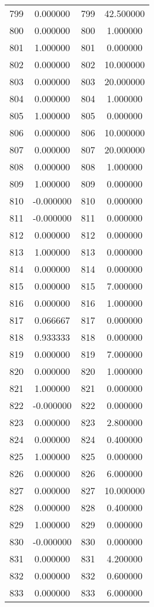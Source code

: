\documentclass[12pt]{article}
\begin{document}
\begin{longtable}{@{}cccc@{}}
799 & 0.000000 & 799 & 42.500000 \\
800 & 0.000000 & 800 & 1.000000 \\
801 & 1.000000 & 801 & 0.000000 \\
802 & 0.000000 & 802 & 10.000000 \\
803 & 0.000000 & 803 & 20.000000 \\
804 & 0.000000 & 804 & 1.000000 \\
805 & 1.000000 & 805 & 0.000000 \\
806 & 0.000000 & 806 & 10.000000 \\
807 & 0.000000 & 807 & 20.000000 \\
808 & 0.000000 & 808 & 1.000000 \\
809 & 1.000000 & 809 & 0.000000 \\
810 & -0.000000 & 810 & 0.000000 \\
811 & -0.000000 & 811 & 0.000000 \\
812 & 0.000000 & 812 & 0.000000 \\
813 & 1.000000 & 813 & 0.000000 \\
814 & 0.000000 & 814 & 0.000000 \\
815 & 0.000000 & 815 & 7.000000 \\
816 & 0.000000 & 816 & 1.000000 \\
817 & 0.066667 & 817 & 0.000000 \\
818 & 0.933333 & 818 & 0.000000 \\
819 & 0.000000 & 819 & 7.000000 \\
820 & 0.000000 & 820 & 1.000000 \\
821 & 1.000000 & 821 & 0.000000 \\
822 & -0.000000 & 822 & 0.000000 \\
823 & 0.000000 & 823 & 2.800000 \\
824 & 0.000000 & 824 & 0.400000 \\
825 & 1.000000 & 825 & 0.000000 \\
826 & 0.000000 & 826 & 6.000000 \\
827 & 0.000000 & 827 & 10.000000 \\
828 & 0.000000 & 828 & 0.400000 \\
829 & 1.000000 & 829 & 0.000000 \\
830 & -0.000000 & 830 & 0.000000 \\
831 & 0.000000 & 831 & 4.200000 \\
832 & 0.000000 & 832 & 0.600000 \\
833 & 0.000000 & 833 & 6.000000 \\

\end{longtable}
\end{document}
